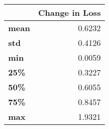 \begin{tabular}{lr}
\toprule
{} &  Change in Loss \\
\midrule
\textbf{mean} &          0.6232 \\
\textbf{std } &          0.4126 \\
\textbf{min } &          0.0059 \\
\textbf{25\% } &          0.3227 \\
\textbf{50\% } &          0.6055 \\
\textbf{75\% } &          0.8457 \\
\textbf{max } &          1.9321 \\
\bottomrule
\end{tabular}
